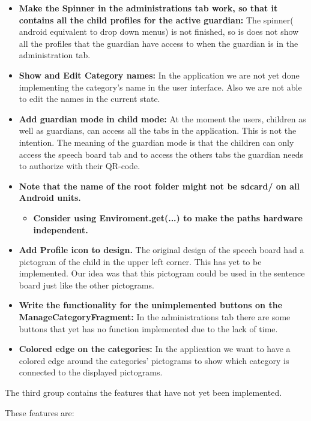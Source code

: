 \begin{itemize}
	\item \textbf{Make the Spinner in the administrations tab work, so that it contains all the child profiles for the active guardian:} The spinner( android equivalent to drop down menus) is not finished, so is does not show all the profiles that the guardian have access to when the guardian is in the administration tab.  
	\item \textbf{Show and Edit Category names:} In the application we are not yet done implementing the category's name in the user interface. Also we are not able to edit the names in the current state. 
	 
	\item \textbf{Add guardian mode in child mode:} At the moment the users, children as well as guardians, can access all the tabs in the application. This is not the intention. The meaning of the guardian mode is that the children can only access the speech board tab and to access the others tabs the guardian needs to authorize with their QR-code.  
	
	\item \textbf{Note that the name of the root folder might not be sdcard/ on all Android units.}
	\begin{itemize}
		\item \textbf{Consider using Enviroment.get(...) to make the paths hardware independent.}
	\end{itemize}
	\item \textbf{Add Profile icon to design.} The original design of the speech board had a pictogram of the child in the upper left corner. This has yet to be implemented. Our idea was that this pictogram could be used in the sentence board just like the other pictograms.
	\item \textbf{Write the functionality for the unimplemented buttons on the ManageCategoryFragment:} In the administrations tab there are some buttons that yet has no function implemented due to the lack of time.
	 
	\item \textbf{Colored edge on the categories:} In the application we want to have a colored edge around the categories' pictograms to show which category is connected to the displayed pictograms.
\end{itemize}


The third group contains the features that have not yet been implemented.

These features are: 

